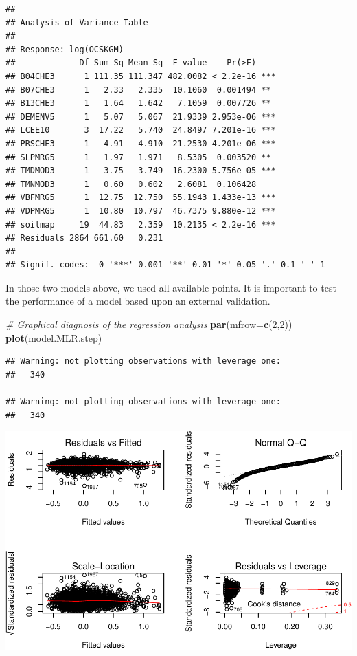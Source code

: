 \documentclass[10pt,b5paper,]{book}
\newenvironment{Shaded}{\begin{snugshade}}{\end{snugshade}}
\newcommand{\CommentTok}[1]{\textcolor[rgb]{0.56,0.35,0.01}{\textit{#1}}}
\newcommand{\DataTypeTok}[1]{\textcolor[rgb]{0.13,0.29,0.53}{#1}}
\newcommand{\DecValTok}[1]{\textcolor[rgb]{0.00,0.00,0.81}{#1}}
\newcommand{\KeywordTok}[1]{\textcolor[rgb]{0.13,0.29,0.53}{\textbf{#1}}}
\newcommand{\NormalTok}[1]{#1}
\theoremstyle{definition}
\theoremstyle{definition}
\theoremstyle{definition}
\theoremstyle{remark}
\begin{document}
\begin{verbatim}
## 
## Analysis of Variance Table
## 
## Response: log(OCSKGM)
##             Df Sum Sq Mean Sq  F value    Pr(>F)    
## B04CHE3      1 111.35 111.347 482.0082 < 2.2e-16 ***
## B07CHE3      1   2.33   2.335  10.1060  0.001494 ** 
## B13CHE3      1   1.64   1.642   7.1059  0.007726 ** 
## DEMENV5      1   5.07   5.067  21.9339 2.953e-06 ***
## LCEE10       3  17.22   5.740  24.8497 7.201e-16 ***
## PRSCHE3      1   4.91   4.910  21.2530 4.201e-06 ***
## SLPMRG5      1   1.97   1.971   8.5305  0.003520 ** 
## TMDMOD3      1   3.75   3.749  16.2300 5.756e-05 ***
## TMNMOD3      1   0.60   0.602   2.6081  0.106428    
## VBFMRG5      1  12.75  12.750  55.1943 1.433e-13 ***
## VDPMRG5      1  10.80  10.797  46.7375 9.880e-12 ***
## soilmap     19  44.83   2.359  10.2135 < 2.2e-16 ***
## Residuals 2864 661.60   0.231                       
## ---
## Signif. codes:  0 '***' 0.001 '**' 0.01 '*' 0.05 '.' 0.1 ' ' 1
\end{verbatim}

In those two models above, we used all available points. It is important
to test the performance of a model based upon an external validation.

\begin{Shaded}
\begin{Highlighting}[]
\CommentTok{# Graphical diagnosis of the regression analysis}
\KeywordTok{par}\NormalTok{(}\DataTypeTok{mfrow=}\KeywordTok{c}\NormalTok{(}\DecValTok{2}\NormalTok{,}\DecValTok{2}\NormalTok{))}
\KeywordTok{plot}\NormalTok{(model.MLR.step)}
\end{Highlighting}
\end{Shaded}

\begin{verbatim}
## Warning: not plotting observations with leverage one:
##   340

## Warning: not plotting observations with leverage one:
##   340
\end{verbatim}

\includegraphics{SOCMapping_files/figure-latex/unnamed-chunk-45-1.pdf}
\end{document}
